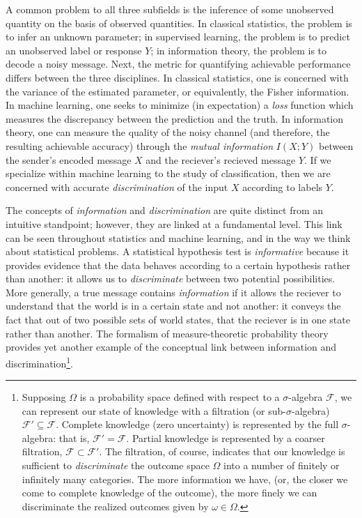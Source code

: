 A common problem to all three subfields is the inference of some
unobserved quantity on the basis of observed quantities.  In classical
statistics, the problem is to infer an unknown parameter; in
supervised learning, the problem is to predict an unobserved label or
response $Y$; in information theory, the problem is to decode a noisy
message.  Next, the metric for quantifying achievable performance
differs between the three disciplines.  In classical statistics, one
is concerned with the variance of the estimated parameter, or
equivalently, the Fisher information.  In machine learning, one seeks
to minimize (in expectation) a \emph{loss} function which measures the
discrepancy between the prediction and the truth.  In information
theory, one can measure the quality of the noisy channel (and
therefore, the resulting achievable accuracy) through the \emph{mutual
  information} $I(X; Y)$ between the sender's encoded message $X$ and
the reciever's recieved message $Y$.  If we specialize within machine
learning to the study of classification, then we are concerned with
accurate \emph{discrimination} of the input $X$ according to labels
$Y$.

The concepts of \emph{information} and \emph{discrimination} are quite
distinct from an intuitive standpoint; however, they are linked at a
fundamental level.  This link can be seen throughout statistics and
machine learning, and in the way we think about statistical problems.
A statistical hypothesis test is \emph{informative} because it
provides evidence that the data behaves according to a certain
hypothesis rather than another: it allows us to \emph{discriminate}
between two potential possibilities.  More generally, a true message
contains \emph{information} if it allows the reciever to understand
that the world is in a certain state and not another: it conveys the
fact that out of two possible sets of world states, that the reciever
is in one state rather than another.  The formalism of
measure-theoretic probability theory provides yet another example of
the conceptual link between information and
discrimination\footnote{Supposing $\Omega$ is a probability space
  defined with respect to a $\sigma$-algebra $\mathcal{F}$, we can
  represent our state of knowledge with a filtration (or
  sub-$\sigma$-algebra) $\mathcal{F}' \subseteq \mathcal{F}$.
  Complete knowledge (zero uncertainty) is represented by the full
  $\sigma$-algebra: that is, $\mathcal{F}' = \mathcal{F}$.  Partial
  knowledge is represented by a coarser filtration, $\mathcal{F}
  \subset \mathcal{F}'$.  The filtration, of course, indicates that
  our knowledge is sufficient to \emph{discriminate} the outcome space
  $\Omega$ into a number of finitely or infinitely many categories.
  The more information we have, (or, the closer we come to complete
  knowledge of the outcome), the more finely we can discriminate the
  realized outcomes given by $\omega \in \Omega$.}.

